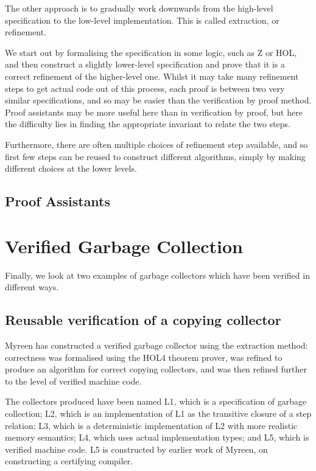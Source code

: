 The other approach is to gradually work downwards from the high-level
specification to the low-level implementation. This is called
extraction, or refinement.

We start out by formalising the specification in some logic, such as Z
or HOL, and then construct a slightly lower-level specification and
prove that it is a correct refinement of the higher-level one. Whilst
it may take many refinement steps to get actual code out of this
process, each proof is between two very similar specifications, and so
may be easier than the verification by proof method. Proof assistants
may be more useful here than in verification by proof, but here the
difficulty lies in finding the appropriate invariant to relate the two
steps.

Furthermore, there are often multiple choices of refinement step
available, and so first few steps can be reused to construct different
algorithms, simply by making different choices at the lower levels.

\subsection{Proof Assistants}


\section{Verified Garbage Collection}

Finally, we look at two examples of garbage collectors which have been
verified in different ways.

\subsection{Reusable verification of a copying collector}

Myreen\cite{Myreen10} has constructed a verified garbage collector
using the extraction method: correctness was formalised using the HOL4
theorem prover, was refined to produce an algorithm for correct
copying collectors, and was then refined further to the level of
verified machine code.

The collectors produced have been named L1, which is a specification
of garbage collection; L2, which is an implementation of L1 as the
transitive closure of a step relation; L3, which is a deterministic
implementation of L2 with more realistic memory semantics; L4, which
uses actual implementation types; and L5, which is verified machine
code. L5 is constructed by earlier work of Myreen, on constructing a
certifying compiler.

